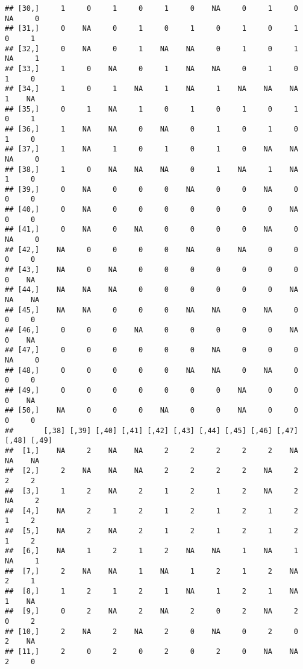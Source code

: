 \documentclass[
]{article}
\begin{document}
\begin{verbatim}
## [30,]     1     0     1     0     1     0    NA     0     1     0    NA     0
## [31,]     0    NA     0     1     0     1     0     1     0     1     0     1
## [32,]     0    NA     0     1    NA    NA     0     1     0     1    NA     1
## [33,]     1     0    NA     0     1    NA    NA     0     1     0     1     0
## [34,]     1     0     1    NA     1    NA     1    NA    NA    NA     1    NA
## [35,]     0     1    NA     1     0     1     0     1     0     1     0     1
## [36,]     1    NA    NA     0    NA     0     1     0     1     0     1     0
## [37,]     1    NA     1     0     1     0     1     0    NA    NA    NA     0
## [38,]     1     0    NA    NA    NA     0     1    NA     1    NA     1     0
## [39,]     0    NA     0     0     0    NA     0     0    NA     0     0     0
## [40,]     0    NA     0     0     0     0     0     0     0    NA     0     0
## [41,]     0    NA     0    NA     0     0     0     0    NA     0    NA     0
## [42,]    NA     0     0     0     0    NA     0    NA     0     0     0     0
## [43,]    NA     0    NA     0     0     0     0     0     0     0     0    NA
## [44,]    NA    NA    NA     0     0     0     0     0     0    NA    NA    NA
## [45,]    NA    NA     0     0     0    NA    NA     0    NA     0     0     0
## [46,]     0     0     0    NA     0     0     0     0     0    NA     0    NA
## [47,]     0     0     0     0     0     0    NA     0     0     0    NA     0
## [48,]     0     0     0     0     0    NA    NA     0    NA     0     0     0
## [49,]     0     0     0     0     0     0     0    NA     0     0     0    NA
## [50,]    NA     0     0     0    NA     0     0    NA     0     0     0     0
##       [,38] [,39] [,40] [,41] [,42] [,43] [,44] [,45] [,46] [,47] [,48] [,49]
##  [1,]    NA     2    NA    NA     2     2     2     2     2    NA    NA    NA
##  [2,]     2    NA    NA    NA     2     2     2     2    NA     2     2     2
##  [3,]     1     2    NA     2     1     2     1     2    NA     2    NA     2
##  [4,]    NA     2     1     2     1     2     1     2     1     2     1     2
##  [5,]    NA     2    NA     2     1     2     1     2     1     2     1     2
##  [6,]    NA     1     2     1     2    NA    NA     1    NA     1    NA     1
##  [7,]     2    NA    NA     1    NA     1     2     1     2    NA     2     1
##  [8,]     1     2     1     2     1    NA     1     2     1    NA     1    NA
##  [9,]     0     2    NA     2    NA     2     0     2    NA     2     0     2
## [10,]     2    NA     2    NA     2     0    NA     0     2     0     2    NA
## [11,]     2     0     2     0     2     0     2     0    NA    NA     2     0

\end{verbatim}
\end{document}
